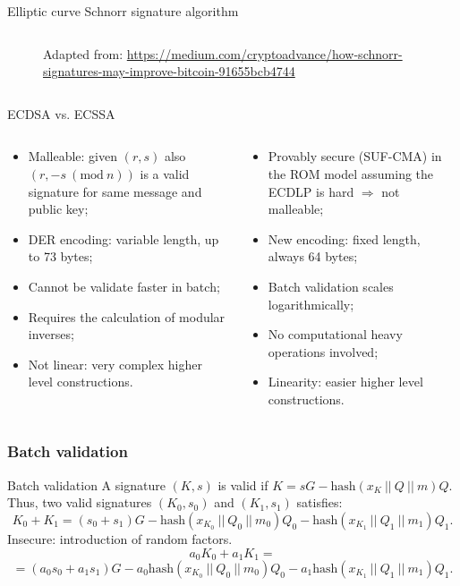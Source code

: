 \documentclass[slidescentered]{beamer}
\newcommand{\source}[1]{\caption*{\tiny Adapted from: {#1}} }
\begin{document}
\begin{frame}{Elliptic curve Schnorr signature algorithm}
\begin{columns}
\begin{column}{0.5\linewidth}
\begin{figure}
{						\source{\tiny \url{https://medium.com/cryptoadvance/how-schnorr-signatures-may-improve-bitcoin-91655bcb4744}}}
				\end{figure}
			\end{column}
		\end{columns}
	\end{frame}

	\begin{frame}{ECDSA vs. ECSSA}
		\begin{columns}
			\begin{column}{0.5\linewidth}
				\pause
				\begin{itemize}
					\item<2 -> Malleable: given $(r, s)$ also $(r, -s \ (\text{mod} \ n))$ is a valid signature for same message and public key;
					\item<3 -> DER encoding: variable length, up to 73 bytes;
					\item<4 -> Cannot be validate faster in batch;
					\item<5 -> Requires the calculation of modular inverses;
					\item<6 -> Not linear: very complex higher level constructions.
				\end{itemize}
			\end{column}
			\begin{column}{0.5\linewidth}
				\begin{itemize}
					\item<2 -> Provably secure (SUF-CMA) in the ROM model assuming the ECDLP is hard $\Longrightarrow$ not malleable;
					\item<3 -> New encoding: fixed length, always 64 bytes;
					\item<4 -> Batch validation scales logarithmically;
					\item<5 -> No computational heavy operations involved;
					\item<6 -> Linearity: easier higher level constructions.
				\end{itemize}
			\end{column}
		\end{columns}
	\end{frame}

	\subsubsection{Batch validation}
	\begin{frame}{Batch validation}
		A signature $(K, s)$ is valid if $K = sG - \text{hash}(x_K \ || \ Q \ || \ m)Q$. Thus, two valid signatures $(K_0, s_0)$ and $(K_1, s_1)$ satisfies:
		$$K_0 + K_1 = (s_0 + s_1)G - \text{hash}(x_{K_0} \ || \ Q_0 \ || \ m_0)Q_0 - \text{hash}(x_{K_1} \ || \ Q_1 \ || \ m_1)Q_1.$$
		Insecure: introduction of random factors.
		$$a_0K_0 + a_1K_1 =$$ $$
		= (a_0s_0 + a_1s_1)G - a_0\text{hash}(x_{K_0} \ || \ Q_0 \ || \ m_0)Q_0 - a_1\text{hash}(x_{K_1} \ || \ Q_1 \ || \ m_1)Q_1.$$
	\end{frame}
\end{document}
